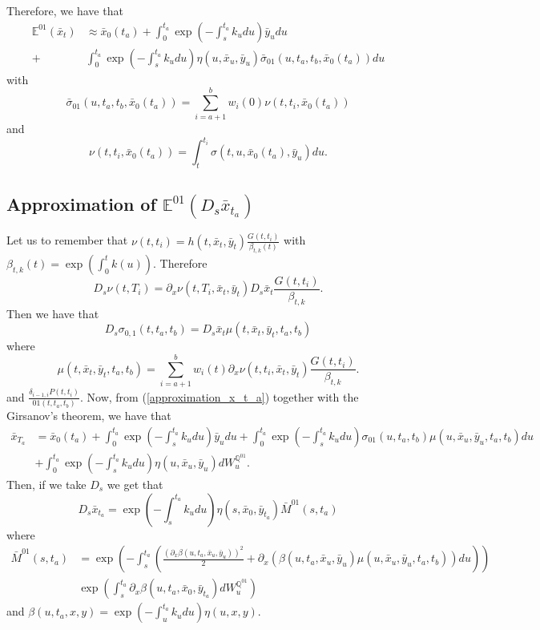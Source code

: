 \documentclass[a4paper,10pt]{article}
\newcommand{\1}{\mathbf{1}}
\begin{document}
Therefore, we have that
\begin{align}
\mathbb{E}^{01}\left(\bar{x}_t\right) &\approx \bar{x}_0(t_a)  + \int_{0}^{t_a} \exp\left(-\int_{s}^{t_a}k_u du\right) \bar{y}_u du \nonumber \\ 
+ &\int_{0}^{t_a} \exp\left(-\int_{s}^{t_a}k_u du \right) \eta(u,\bar{x}_u,\bar{y}_u) \bar{\sigma}_{01}(u, t_a, t_b,\bar{x}_0(t_a)) du
\end{align}
with
$$
\bar{\sigma}_{01}(u, t_a, t_b,\bar{x}_0(t_a)) = \sum_{i=a+1}^{b} w_i(0) \nu(t,t_i,\bar{x}_0(t_a))
$$
and
$$
\nu(t,t_i,\bar{x}_0(t_a)) = \int_{t}^{t_i} \sigma(t,u,\bar{x}_0(t_a),\bar{y}_u) du.
$$ 

\subsection{Approximation of $\mathbb{E}^{01}\left(D_s \bar{x}_{t_a} \right)$}\label{approximation_under_annuity_measeure_d_s}
Let us to remember that $\nu(t,t_i)=h(t,\bar{x}_t,\bar{y}_t) \frac{G(t,t_i)}{\beta_{t,k}(t)}$ with  $\beta_{t,k}(t) = \exp\left(\int_{0}^{t}k(u)\right)$.
Therefore 
\begin{equation*}
D_s \nu(t,T_i) = \partial_x \nu(t,T_i, \bar{x}_t, \bar{y}_t) D_s \bar{x}_t  \frac{G(t,t_i)}{\beta_{t,k}}.
\end{equation*}
Then we have that
\begin{equation}
D_s \sigma_{0,1}(t,t_a,t_b) =  D_s \bar{x}_t \mu(t,\bar{x}_t, \bar{y}_t, t_a,t_b)
\end{equation}
where 
$$
\mu(t,\bar{x}_t, \bar{y}_t, t_a,t_b) =  \sum_{i=a+1}^{b} w_i(t) \partial_x \nu(t,t_i, \bar{x}_t, \bar{y}_t) \frac{G(t,t_i)}{\beta_{t,k}}.
$$
and $\frac{\delta_{i-1,i} P(t,t_i)}{01(t,t_a,t_b)}$. Now, from (\ref{approximation_x_t_a}) together with the Girsanov's theorem, we have that
\begin{align*}
\bar{x}_{T_a} &=  \bar{x}_0(t_a)  + \int_{0}^{t_a} \exp\left(-\int_{s}^{t_a}k_u du\right) \bar{y}_u du + \int_{0}^{t_a} \exp\left(-\int_{s}^{t_a}k_u du\right) \sigma_{01}(u,t_a,t_b) \mu(u,\bar{x}_u, \bar{y}_u, t_a,t_b) du \nonumber \\\
&+  \int_{0}^{t_a}  \exp\left(-\int_{s}^{t_a}k_u du \right) \eta(u,\bar{x}_u,\bar{y}_u) dW_u^{\mathbb{Q}^{01}}.
\end{align*}
Then, if we take $D_s$ we get that
\begin{equation*}
D_s \bar{x}_{t_a} = \exp\left(-\int_{s}^{t_a}k_u du \right) \eta(s,\bar{x}_0,\bar{y}_{t_a})\bar{M}^{01}(s,t_a)
\end{equation*}
where
\begin{align*}
\bar{M}^{01}(s,t_a) &= \exp\left(-\int_{s}^{t_a} \left(\frac{\left(\partial_x \beta(u,t_a,\bar{x}_u,\bar{y}_{u})\right)^{2}}{2} + \partial_x (\beta(u,t_a,\bar{x}_u,\bar{y}_{u}) \mu(u,\bar{x}_u,\bar{y}_u,t_a,t_b)) du \right)\right) \\
&\exp\left(\int_{s}^{t_a} \partial_x \beta(u,t_a,\bar{x}_0,\bar{y}_{t_a}) dW^{\mathbb{Q}^{01}}_u \right)
\end{align*}
and $\beta(u,t_a,x,y) = \exp\left(-\int_{u}^{t_a}k_u du\right)\eta(u,x,y)$.
\end{document}
